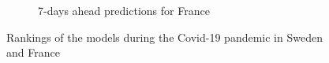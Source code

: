 \begin{figure}[h!]
\begin{subfigure}[b]{0.45\textwidth}
        \caption{7-days ahead predictions for France}
        \label{fig:sousfig2gh}
    \end{subfigure}
    \hfill
    \caption{Rankings of the models during the Covid-19 pandemic in Sweden and France}
    \label{fig:rankings_real_data}
\end{figure}

